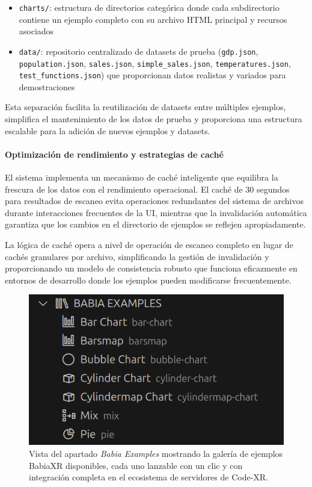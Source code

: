 \documentclass[a4paper, 12pt]{book}
\begin{document}
\begin{itemize}
  \item \texttt{charts/}: estructura de directorios categórica donde cada subdirectorio contiene un ejemplo completo con su archivo HTML principal y recursos asociados
  \item \texttt{data/}: repositorio centralizado de datasets de prueba (\texttt{gdp.json}, \texttt{population.json}, \texttt{sales.json}, \texttt{simple\_sales.json}, \texttt{temperatures.json}, \texttt{test\_functions.json}) que proporcionan datos realistas y variados para demostraciones
\end{itemize}

Esta separación facilita la reutilización de datasets entre múltiples ejemplos, simplifica el mantenimiento de los datos de prueba y proporciona una estructura escalable para la adición de nuevos ejemplos y datasets.

\paragraph{Optimización de rendimiento y estrategias de caché}
El sistema implementa un mecanismo de caché inteligente que equilibra la frescura de los datos con el rendimiento operacional. El caché de 30 segundos para resultados de escaneo evita operaciones redundantes del sistema de archivos durante interacciones frecuentes de la UI, mientras que la invalidación automática garantiza que los cambios en el directorio de ejemplos se reflejen apropiadamente.

La lógica de caché opera a nivel de operación de escaneo completo en lugar de cachés granulares por archivo, simplificando la gestión de invalidación y proporcionando un modelo de consistencia robusto que funciona eficazmente en entornos de desarrollo donde los ejemplos pueden modificarse frecuentemente.

\begin{figure}[H]
\centering
\includegraphics[width=0.55\linewidth]{img/ui-babia-examples.png}
\caption{Vista del apartado \emph{Babia Examples} mostrando la galería de ejemplos BabiaXR disponibles, cada uno lanzable con un clic y con integración completa en el ecosistema de servidores de Code-XR.}
\label{fig:ui-babia-examples}
\end{figure}
\end{document}
